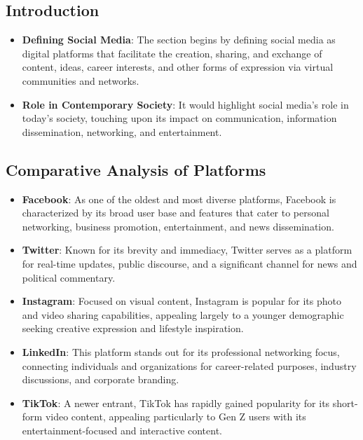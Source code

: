 \documentclass[
]{book}
\providecommand{\tightlist}{%
  \setlength{\itemsep}{0pt}\setlength{\parskip}{0pt}}
\begin{document}
\hypertarget{introduction}{%
\subsection*{Introduction}\label{introduction}}

\begin{itemize}
\tightlist
\item
  \textbf{Defining Social Media}: The section begins by defining social media as digital platforms that facilitate the creation, sharing, and exchange of content, ideas, career interests, and other forms of expression via virtual communities and networks.
\item
  \textbf{Role in Contemporary Society}: It would highlight social media's role in today's society, touching upon its impact on communication, information dissemination, networking, and entertainment.
\end{itemize}

\hypertarget{comparative-analysis-of-platforms}{%
\subsection*{Comparative Analysis of Platforms}\label{comparative-analysis-of-platforms}}

\begin{itemize}
\tightlist
\item
  \textbf{Facebook}: As one of the oldest and most diverse platforms, Facebook is characterized by its broad user base and features that cater to personal networking, business promotion, entertainment, and news dissemination.
\item
  \textbf{Twitter}: Known for its brevity and immediacy, Twitter serves as a platform for real-time updates, public discourse, and a significant channel for news and political commentary.
\item
  \textbf{Instagram}: Focused on visual content, Instagram is popular for its photo and video sharing capabilities, appealing largely to a younger demographic seeking creative expression and lifestyle inspiration.
\item
  \textbf{LinkedIn}: This platform stands out for its professional networking focus, connecting individuals and organizations for career-related purposes, industry discussions, and corporate branding.
\item
  \textbf{TikTok}: A newer entrant, TikTok has rapidly gained popularity for its short-form video content, appealing particularly to Gen Z users with its entertainment-focused and interactive content.
\end{itemize}
\end{document}
